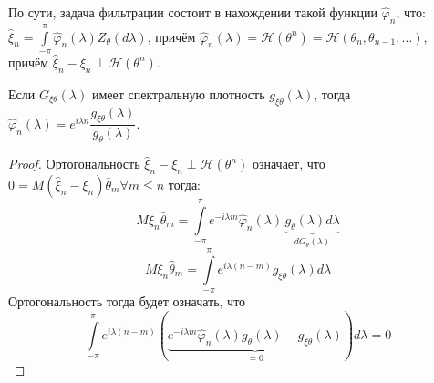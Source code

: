 По сути, задача фильтрации состоит в нахождении такой функции $\hat{\varphi}_n$, что:
$\hat{\xi}_n = \int\limits_{-\pi}^\pi \hat{\varphi}_n(\lambda) Z_\theta(d\lambda)$,
причём $\hat{\varphi}_n(\lambda) = \mathcal{H}(\theta^n) = \mathcal{H}( \theta_n, \theta_{n-1}, \dots )$,
причём $\hat{\xi}_n - \xi_n \perp \mathcal{H}(\theta^n)$.

\begin{theorem}
  Если $G_{\xi\theta} (\lambda)$ имеет спектральную плотность $g_{\xi\theta} (\lambda)$, тогда 
  $\hat{\varphi}_n(\lambda) = e^{i\lambda n} \dfrac{g_{\xi\theta}(\lambda)}{g_\theta(\lambda)}$.
\end{theorem}
\begin{proof}
  Ортогональность $\hat{\xi}_n - \xi_n \perp \mathcal{H}(\theta^n)$ означает, что 
  $0 = M(\hat{\xi}_n - \xi_n) \bar{\theta}_m \forall m \leqslant n$ тогда:
  \[
    M\hat{\xi}_n \bar{\theta}_m = \int\limits_{-\pi}^\pi e^{-i\lambda m} \hat{\varphi}_n (\lambda) \, \underbrace{g_\theta(\lambda) d\lambda}_{dG_\theta(\lambda)}
  \]
  \[
    M\xi_n \hat{\theta}_m = \int\limits_{-\pi}^\pi e^{i\lambda(n-m)} g_{\xi\theta} (\lambda) d\lambda
  \]
  Ортогональность тогда будет означать, что
  \[
    \int\limits_{-\pi}^\pi e^{i\lambda (n-m)} \left(\underbrace{
      e^{-i\lambda m}\hat{\varphi}_n (\lambda) g_\theta(\lambda) -
      g_{\xi\theta}(\lambda)
  }_{=0}\right) d\lambda = 0
  \]
\end{proof}
